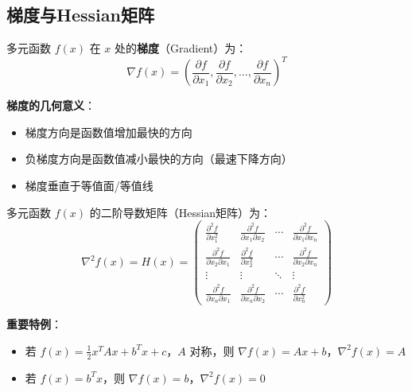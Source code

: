 \subsection{梯度与Hessian矩阵}

\begin{definition}[梯度]
多元函数 $f(x)$ 在 $x$ 处的\textbf{梯度}（Gradient）为：
\[
\nabla f(x) = \left(\frac{\partial f}{\partial x_1}, \frac{\partial f}{\partial x_2}, \ldots, \frac{\partial f}{\partial x_n}\right)^T
\]
\end{definition}

\textbf{梯度的几何意义}：
\begin{itemize}
    \item 梯度方向是函数值增加最快的方向
    \item 负梯度方向是函数值减小最快的方向（最速下降方向）
    \item 梯度垂直于等值面/等值线
\end{itemize}

\begin{definition}[Hessian矩阵]
多元函数 $f(x)$ 的二阶导数矩阵（Hessian矩阵）为：
\[
\nabla^2 f(x) = H(x) = \begin{pmatrix}
\frac{\partial^2 f}{\partial x_1^2} & \frac{\partial^2 f}{\partial x_1 \partial x_2} & \cdots & \frac{\partial^2 f}{\partial x_1 \partial x_n} \\[6pt]
\frac{\partial^2 f}{\partial x_2 \partial x_1} & \frac{\partial^2 f}{\partial x_2^2} & \cdots & \frac{\partial^2 f}{\partial x_2 \partial x_n} \\[6pt]
\vdots & \vdots & \ddots & \vdots \\[6pt]
\frac{\partial^2 f}{\partial x_n \partial x_1} & \frac{\partial^2 f}{\partial x_n \partial x_2} & \cdots & \frac{\partial^2 f}{\partial x_n^2}
\end{pmatrix}
\]
\end{definition}

\textbf{重要特例}：
\begin{itemize}
    \item 若 $f(x) = \frac{1}{2}x^T A x + b^T x + c$，$A$ 对称，则 $\nabla f(x) = Ax + b$，$\nabla^2 f(x) = A$
    \item 若 $f(x) = b^T x$，则 $\nabla f(x) = b$，$\nabla^2 f(x) = 0$
\end{itemize}

